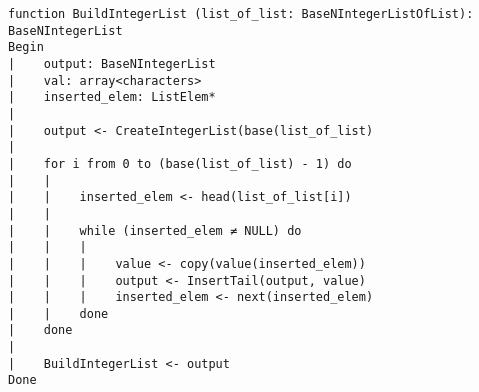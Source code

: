 \begin{lstlisting}[breaklines]
function BuildIntegerList (list_of_list: BaseNIntegerListOfList): BaseNIntegerList
Begin
|    output: BaseNIntegerList
|    val: array<characters>
|    inserted_elem: ListElem*
|
|    output <- CreateIntegerList(base(list_of_list)
|
|    for i from 0 to (base(list_of_list) - 1) do
|    |
|    |    inserted_elem <- head(list_of_list[i])
|    |
|    |    while (inserted_elem ≠ NULL) do
|    |    |
|    |    |    value <- copy(value(inserted_elem))
|    |    |    output <- InsertTail(output, value)
|    |    |    inserted_elem <- next(inserted_elem)
|    |    done
|    done
|
|    BuildIntegerList <- output
Done
\end{lstlisting}
